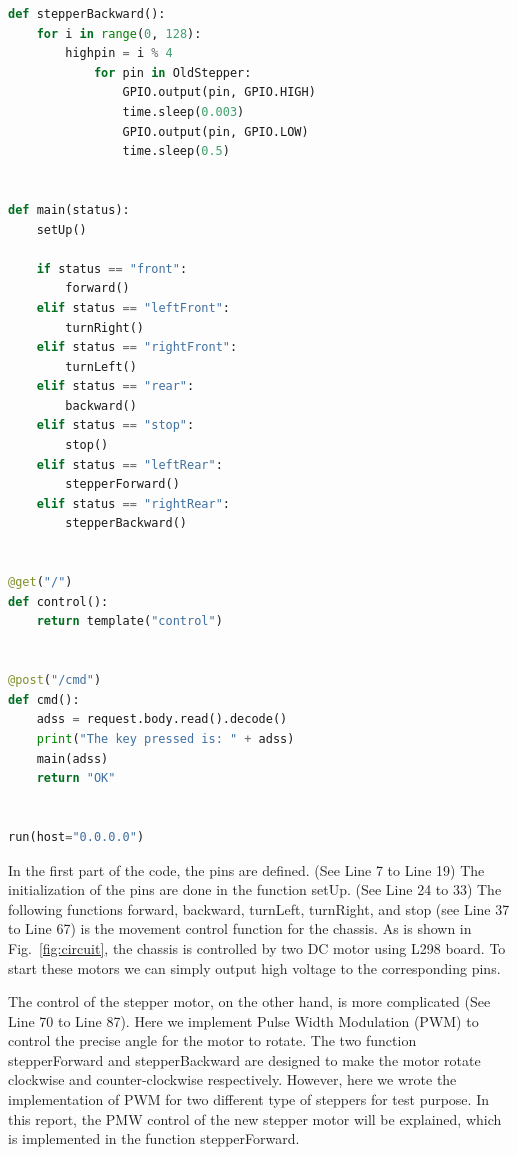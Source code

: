 \documentclass[12pt]{article}
\begin{document}
\begin{lstlisting}[language=python]
def stepperBackward():
	for i in range(0, 128):
		highpin = i % 4
			for pin in OldStepper:
				GPIO.output(pin, GPIO.HIGH)
				time.sleep(0.003)
				GPIO.output(pin, GPIO.LOW)
				time.sleep(0.5)


def main(status):
	setUp()

	if status == "front":
		forward()
	elif status == "leftFront":
		turnRight()
	elif status == "rightFront":
		turnLeft()
	elif status == "rear":
		backward()
	elif status == "stop":
		stop()
	elif status == "leftRear":
		stepperForward()
	elif status == "rightRear":
		stepperBackward()


@get("/")
def control():
	return template("control")


@post("/cmd")
def cmd():
	adss = request.body.read().decode()
	print("The key pressed is: " + adss)
	main(adss)
	return "OK"


run(host="0.0.0.0")

\end{lstlisting}

In the first part of the code, the pins are defined. (See Line 7 to Line 19) The initialization of the pins are done in the function setUp. (See Line 24 to 33) The following functions forward, backward, turnLeft, turnRight, and stop (see Line 37 to Line 67) is the movement control function for the chassis. As is shown in Fig.~\ref{fig:circuit}, the chassis is controlled by two DC motor using L298 board. To start these motors we can simply output high voltage to the corresponding pins.

The control of the stepper motor, on the other hand, is more complicated (See Line 70 to Line 87). Here we implement Pulse Width Modulation (PWM) to control the precise angle for the motor to rotate. The two function stepperForward and stepperBackward are designed to make the motor rotate clockwise and counter-clockwise respectively. However, here we wrote the implementation of PWM for two different type of steppers for test purpose. In this report, the PMW control of the new stepper motor will be explained, which is implemented in the function stepperForward.
\end{document}
